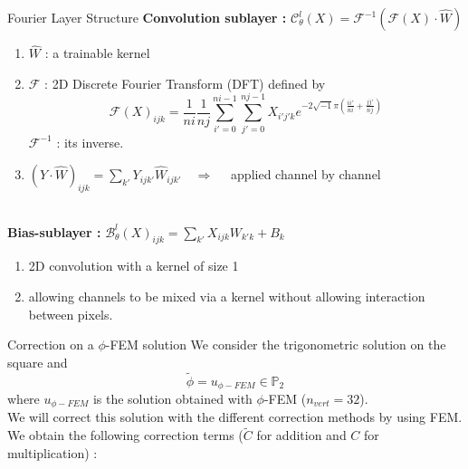 \documentclass[compress,10pt,xcolor={table,dvipsnames},t]{beamer}
\begin{document}
	\begin{frame}{Fourier Layer Structure}
		\textbf{Convolution sublayer : } \quad $\mathcal{C}_\theta^l(X)=\mathcal{F}^{-1}(\mathcal{F}(X)\cdot\hat{W})$ \quad
		\begin{minipage}{0.3\linewidth}
			\vspace{-15pt}
			\centering
		\end{minipage}
		\begin{enumerate}[\ding{217}]
			\item $\hat{W}$ : a trainable kernel
			\item $\mathcal{F}$ : 2D Discrete Fourier Transform (DFT) defined by
			\begin{equation*}
				\mathcal{F}(X)_{ijk}=\frac{1}{ni}\frac{1}{nj}\sum_{i'=0}^{ni-1}\sum_{j'=0}^{nj-1}X_{i'j'k}e^{-2\sqrt{-1}\pi\left(\frac{ii'}{ni}+\frac{jj'}{nj}\right)}
			\end{equation*}
			$\mathcal{F}^{-1}$ : its inverse.
			\item $(Y\cdot\hat{W})_{ijk}=\sum_{k'}Y_{ijk'}\hat{W}_{ijk'} \quad \Rightarrow \quad$ applied channel by channel
		\end{enumerate} \; \\
		\textbf{Bias-sublayer :} \quad  $\mathcal{B}_\theta^l(X)_{ijk}=\sum_{k'}X_{ijk}W_{k'k}+B_k$ \quad
		\begin{minipage}{0.3\linewidth}
			\vspace{-10pt}
		\end{minipage}
		\begin{enumerate}[\ding{217}]
			\item 2D convolution with a kernel of size 1
			\item allowing channels to be mixed via a kernel without allowing interaction between pixels.
		\end{enumerate}
	\end{frame}

	\begin{frame}{Correction on a $\phi$-FEM solution}
		We consider the trigonometric solution on the square and
		$$\tilde{\phi}=u_{\phi-FEM}\in\mathbb{P}_{2}$$
		where $u_{\phi-FEM}$ is the solution obtained with $\phi$-FEM ($n_{vert}=32$). \\
		We will correct this solution with the different correction methods by using FEM. \\
		We obtain the following correction terms ($\tilde{C}$ for addition and $C$ for multiplication) :
		\begin{center}
		\end{center}
	\end{frame}
	
\end{document}
